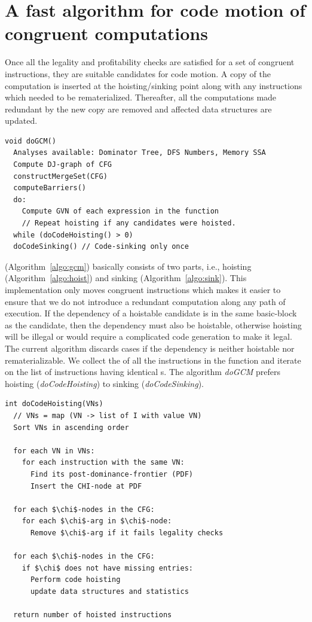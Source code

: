 \documentclass[sigplan,10pt,review,anonymous]{acmart}\settopmatter{printfolios=true,printccs=false,printacmref=false}
\begin{document}
\section{A fast algorithm for code motion of congruent computations}
\label{subsec:optimistic}
Once all the legality and profitability checks are satisfied for a set of
congruent instructions, they are suitable candidates for code motion. A copy of
the computation is inserted at the hoisting/sinking point along with any
instructions which needed to be rematerialized. Thereafter, all the computations
made redundant by the new copy are removed and affected data structures are
updated.

\begin{lstlisting}[caption={Global Code Motion},captionpos=b,label={algo:gcm}]
void doGCM()
  Analyses available: Dominator Tree, DFS Numbers, Memory SSA
  Compute DJ-graph of CFG
  constructMergeSet(CFG)
  computeBarriers()
  do:
    Compute GVN of each expression in the function
    // Repeat hoisting if any candidates were hoisted.
  while (doCodeHoisting() > 0)
  doCodeSinking() // Code-sinking only once
\end{lstlisting}


\GCM{} (Algorithm~\ref{algo:gcm}) basically consists of two parts, i.e., hoisting
(Algorithm~\ref{algo:hoist}) and sinking (Algorithm~\ref{algo:sink}). This
implementation only moves congruent instructions which makes it easier to ensure
that we do not introduce a redundant computation along any path of execution. If
the dependency of a hoistable candidate is in the same basic-block as the
candidate, then the dependency must also be hoistable, otherwise hoisting will
be illegal or would require a complicated code generation to make it legal. The
current algorithm discards cases if the dependency is neither hoistable nor
rematerializable. We collect the \GVN{} of all the instructions in the function
and iterate on the list of instructions having identical \GVN{}s. The algorithm
\emph{doGCM} prefers hoisting (\emph{doCodeHoisting}) to sinking
(\emph{doCodeSinking}).

\begin{lstlisting}[caption={Hoist instructions},captionpos=b,label={algo:hoist}]
int doCodeHoisting(VNs)
  // VNs = map (VN -> list of I with value VN)
  Sort VNs in ascending order

  for each VN in VNs:
    for each instruction with the same VN:
      Find its post-dominance-frontier (PDF)
      Insert the CHI-node at PDF

  for each $\chi$-nodes in the CFG:
    for each $\chi$-arg in $\chi$-node:
      Remove $\chi$-arg if it fails legality checks

  for each $\chi$-nodes in the CFG:
    if $\chi$ does not have missing entries:
      Perform code hoisting
      update data structures and statistics

  return number of hoisted instructions
\end{lstlisting}
\end{document}
